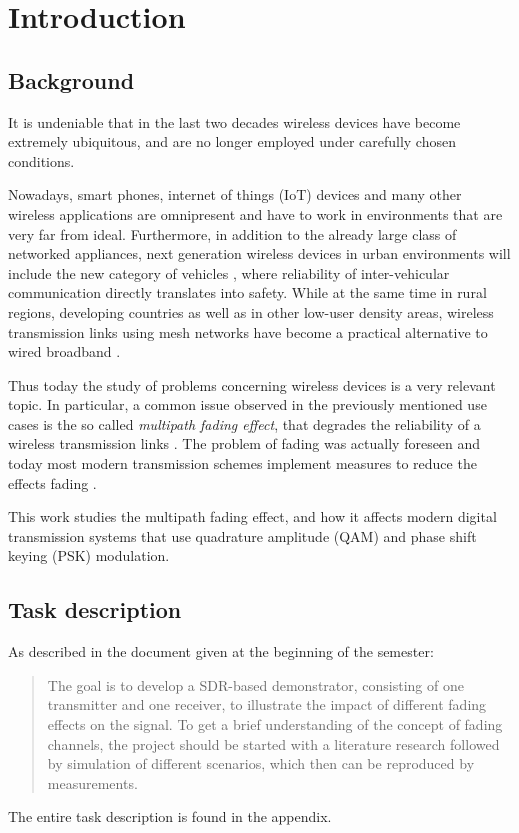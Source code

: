 
\chapter{Introduction} \label{chp:introduction}

\section{Background}

It is undeniable that in the last two decades wireless devices have become extremely ubiquitous, and are no longer employed under carefully chosen conditions.

Nowadays, smart phones, internet of things (IoT) devices and many other wireless applications are omnipresent and have to work in environments that are very far from ideal. Furthermore, in addition to the already large class of networked appliances, next generation wireless devices in urban environments will include the new category of vehicles \cite{AntonescuTB17}, where reliability of inter-vehicular communication directly translates into safety. While at the same time in rural regions, developing countries as well as in other low-user density areas, wireless transmission links using mesh networks have become a practical alternative to wired broadband \cite{Macmillan2019tidal,Subramanian2006rethinking,Flickenger2007wireless}.

Thus today the study of problems concerning wireless devices is a very relevant topic. In particular, a common issue observed in the previously mentioned use cases is the so called \emph{multipath fading effect}, that degrades the reliability of a wireless transmission links \cite{Mathis, Gallager}. The problem of fading was actually foreseen \cite{Frederiksen2002overview,Maddocks1993introduction} and today most modern transmission schemes implement measures to reduce the effects fading \cite{Mathis,Hsu}.

This work studies the multipath fading effect, and how it affects modern digital transmission systems that use quadrature amplitude (QAM) and phase shift keying (PSK) modulation.

\section{Task description}

As described in the document given at the beginning of the semester:
\begin{quote}
	The goal is to develop a SDR-based demonstrator, consisting of one transmitter and one receiver, to illustrate the impact of different fading effects on the signal. To get a brief understanding of the concept of fading channels, the project should be started with a literature research followed by simulation of different scenarios, which then can be reproduced by measurements.
\end{quote}
The entire task description is found in the appendix.

